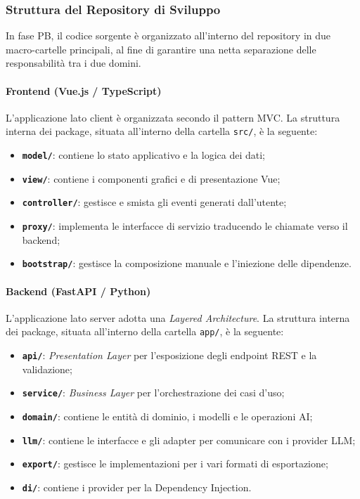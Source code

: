 
\subsubsection{Struttura del Repository di Sviluppo}

In fase PB, il codice sorgente è organizzato all'interno del repository in due macro-cartelle principali, al fine di garantire una netta separazione delle responsabilità tra i due domini.

\paragraph{Frontend (Vue.js / TypeScript)}
L'applicazione lato client è organizzata secondo il pattern MVC. La struttura interna dei package, situata all'interno della cartella \texttt{src/}, è la seguente:
\begin{itemize}
    \item \textbf{\texttt{model/}}: contiene lo stato applicativo e la logica dei dati;
    \item \textbf{\texttt{view/}}: contiene i componenti grafici e di presentazione Vue;
    \item \textbf{\texttt{controller/}}: gestisce e smista gli eventi generati dall'utente;
    \item \textbf{\texttt{proxy/}}: implementa le interfacce di servizio traducendo le chiamate verso il backend;
    \item \textbf{\texttt{bootstrap/}}: gestisce la composizione manuale e l'iniezione delle dipendenze.
\end{itemize}

\paragraph{Backend (FastAPI / Python)}
L'applicazione lato server adotta una \textit{Layered Architecture}. La struttura interna dei package, situata all'interno della cartella \texttt{app/}, è la seguente:
\begin{itemize}
    \item \textbf{\texttt{api/}}: \textit{Presentation Layer} per l'esposizione degli endpoint REST e la validazione;
    \item \textbf{\texttt{service/}}: \textit{Business Layer} per l'orchestrazione dei casi d'uso;
    \item \textbf{\texttt{domain/}}: contiene le entità di dominio, i modelli e le operazioni AI;
    \item \textbf{\texttt{llm/}}: contiene le interfacce e gli adapter per comunicare con i provider LLM;
    \item \textbf{\texttt{export/}}: gestisce le implementazioni per i vari formati di esportazione;
    \item \textbf{\texttt{di/}}: contiene i provider per la Dependency Injection.
\end{itemize}

